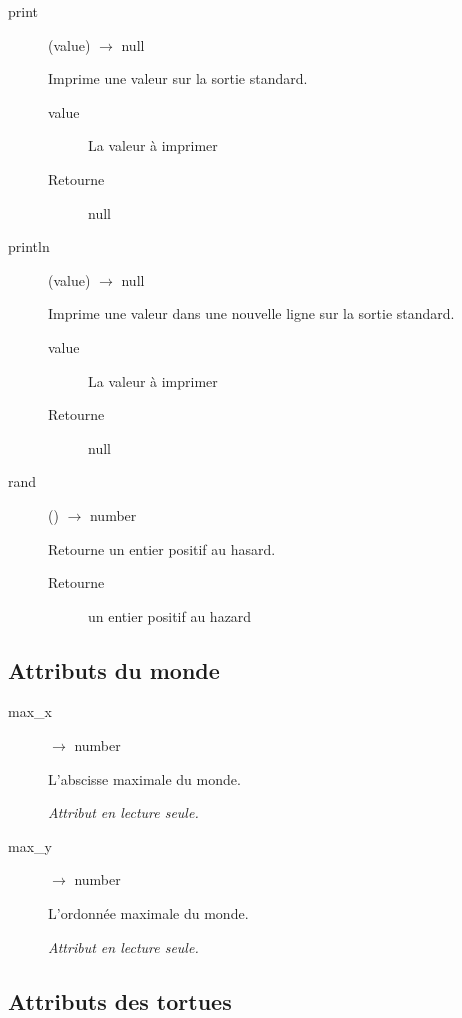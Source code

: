 \begin{description}
	\item[print] (value) $\rightarrow$ null

	Imprime une valeur sur la sortie standard.

	\begin{description}
		\item[value] La valeur à imprimer
		\item[Retourne] null
	\end{description}

	\item[println] (value) $\rightarrow$ null

	Imprime une valeur dans une nouvelle ligne sur la sortie standard.

	\begin{description}
		\item[value] La valeur à imprimer
		\item[Retourne] null
	\end{description}

	\item[rand] () $\rightarrow$ number

	Retourne un entier positif au hasard.

	\begin{description}
		\item[Retourne] un entier positif au hazard
	\end{description}
\end{description}

\subsection{Attributs du monde}

\begin{description}
	\item[max\_x] $\rightarrow$ number

	L'abscisse maximale du monde.

	\emph{Attribut en lecture seule.}

	\item[max\_y] $\rightarrow$ number

	L'ordonnée maximale du monde.

	\emph{Attribut en lecture seule.}
\end{description}

\subsection{Attributs des tortues}

